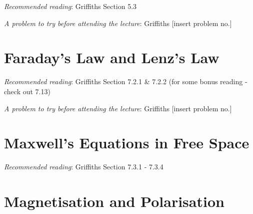 \documentclass[
  letterpaper,
  DIV=11,
  numbers=noendperiod]{scrreprt}
\begin{document}
\emph{Recommended reading}: Griffiths Section 5.3

\emph{A problem to try before attending the lecture}: Griffiths
{[}insert problem no.{]}


\chapter{Faraday's Law and Lenz's Law}\label{faradays-law-and-lenzs-law}

\newcommand{\l}{\mathrm{\mathbf{l}}}
\newcommand{\E}{\mathrm{\mathbf{E}}}
\newcommand{\F}{\mathrm{\mathbf{F}}}
\newcommand{\r}{\mathrm{\mathbf{r}}}

\newcommand{\x}{\mathrm{\mathbf{x}}}
\newcommand{\y}{\mathrm{\mathbf{y}}}
\newcommand{\z}{\mathrm{\mathbf{z}}}

\emph{Recommended reading}: Griffiths Section 7.2.1 \& 7.2.2 (for some
bonus reading - check out 7.13)

\emph{A problem to try before attending the lecture}: Griffiths
{[}insert problem no.{]}


\chapter{Maxwell's Equations in Free
Space}\label{maxwells-equations-in-free-space}

\newcommand{\l}{\mathrm{\mathbf{l}}}
\newcommand{\E}{\mathrm{\mathbf{E}}}
\newcommand{\F}{\mathrm{\mathbf{F}}}
\newcommand{\r}{\mathrm{\mathbf{r}}}

\newcommand{\x}{\mathrm{\mathbf{x}}}
\newcommand{\y}{\mathrm{\mathbf{y}}}
\newcommand{\z}{\mathrm{\mathbf{z}}}

\emph{Recommended reading}: Griffiths Section 7.3.1 - 7.3.4


\chapter{Magnetisation and
Polarisation}\label{magnetisation-and-polarisation}

\newcommand{\l}{\mathrm{\mathbf{l}}}
\newcommand{\E}{\mathrm{\mathbf{E}}}
\newcommand{\F}{\mathrm{\mathbf{F}}}
\newcommand{\r}{\mathrm{\mathbf{r}}}

\newcommand{\x}{\mathrm{\mathbf{x}}}
\newcommand{\y}{\mathrm{\mathbf{y}}}
\newcommand{\z}{\mathrm{\mathbf{z}}}
\end{document}
